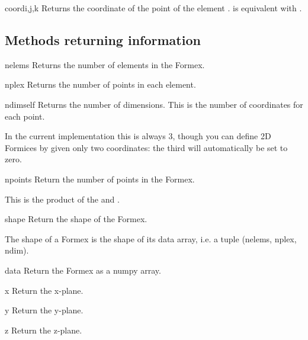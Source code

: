 {{\begin{methoddesc}{coord}{i,j,k}
Returns the coordinate  of the point  of the element .  is equivalent with .
\end{methoddesc}


\subsection{Methods returning information}

\begin{methoddesc}{nelems}{}
Returns the number of elements in the Formex.
\end{methoddesc}

\begin{methoddesc}{nplex}{}
Returns the number of points in each element.
\end{methoddesc}
    
\begin{methoddesc}{ndim}{self}
Returns the number of dimensions. This is the number of coordinates for each point. 

In the current implementation this is always 3, though you can define 2D Formices by given only two coordinates: the third will automatically be set to zero.
\end{methoddesc}

\begin{methoddesc}{npoints}{}
Return the number of points in the Formex.

This is the product of the  and  .
\end{methoddesc}
    
\begin{methoddesc}{shape}{}
Return the shape of the Formex.

The shape of a Formex is the shape of its data array,
i.e. a tuple (nelems, nplex, ndim).
\end{methoddesc}

\begin{methoddesc}{data}{}
  Return the Formex as a numpy array.
\end{methoddesc}
\begin{methoddesc}{x}{}
  Return the x-plane.
\end{methoddesc}
\begin{methoddesc}{y}{}
  Return the y-plane.
\end{methoddesc}
\begin{methoddesc}{z}{}
  Return the z-plane.
\end{methoddesc}

}}
